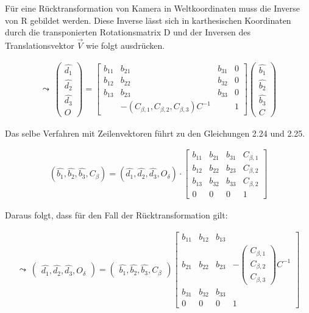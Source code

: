 Für eine Rücktransformation von Kamera in Weltkoordinaten muss die Inverse von R gebildet werden. Diese Inverse lässt sich in karthesischen Koordinaten durch die transponierten Rotationsmatrix D und der Inversen des Translationsvektor $\vec{V}$ wie folgt ausdrücken.

\begin{gather}
	\leadsto \: \begin{pmatrix}
		\hat{d_1}\\
		\hat{d_2}\\
		\hat{d_3}\\
		O
	\end{pmatrix} = 
	\begin{bmatrix}
		b_{11} & b_{21} & b_{31} & 0\\
		b_{12} & b_{22} & b_{32} & 0\\
		b_{13} & b_{23} & b_{33} & 0\\
		&-(	C_{\beta,1}, C_{\beta,2}, C_{\beta,3})C^{-1}& & 1
	\end{bmatrix}
	\begin{pmatrix}
		\hat{b_1}\\
		\hat{b_2}\\
		\hat{b_3}\\
		C
	\end{pmatrix}
\end{gather}

Das selbe Verfahren mit Zeilenvektoren führt zu den Gleichungen 2.24 und 2.25.

\begin{gather}
	(\hat{b_1}, \hat{b_2}, \hat{b_3}, C_\beta) = (\hat{d_1},\hat{d_2}, \hat{d_3}, O_\delta) \cdot
	\begin{bmatrix} 
		b_{11} & b_{21} & b_{31} & C_{\beta,1}\\
		b_{12} & b_{22} & b_{23} & C_{\beta,2}\\
		b_{13} & b_{32} & b_{33} & C_{\beta,2}\\
		0           &       0       &   0         & 1   
	\end{bmatrix}
\end{gather}	

Daraus folgt, dass für den Fall der Rücktransformation gilt:

\begin{gather}
	\leadsto \: \begin{pmatrix}
		\hat{d_1},\hat{d_2},\hat{d_3},O_\delta
	\end{pmatrix} = 
	\begin{pmatrix}
		\hat{b_1},\hat{b_2},\hat{b_3},C_\beta
	\end{pmatrix}
	\begin{bmatrix}
		b_{11} & b_{12} & b_{13} & \\
		b_{21} & b_{22} & b_{23} &  -\begin{pmatrix}
			C_{\beta,1}\\
			C_{\beta,2}\\
			C_{\beta,3}
		\end{pmatrix}C^{-1}\\
		b_{31} & b_{32} & b_{33} & \\
		0&0&0 & 1
	\end{bmatrix}
\end{gather}	

